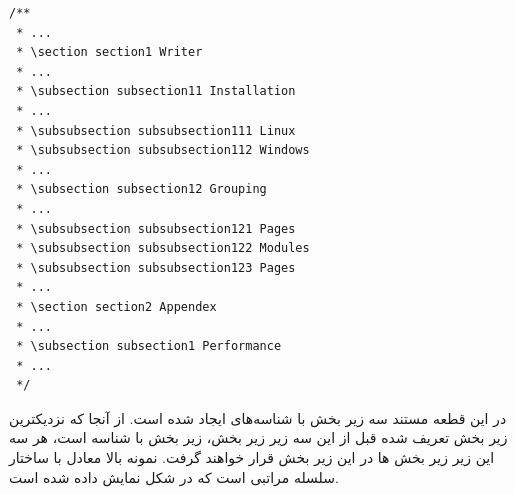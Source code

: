 \begin{latin}
\lstset{language=C++}  
\begin{lstlisting}[frame=single] 
/**
 * ...
 * \section section1 Writer
 * ...
 * \subsection subsection11 Installation
 * ...
 * \subsubsection subsubsection111 Linux
 * \subsubsection subsubsection112 Windows
 * ...
 * \subsection subsection12 Grouping
 * ...
 * \subsubsection subsubsection121 Pages
 * \subsubsection subsubsection122 Modules
 * \subsubsection subsubsection123 Pages
 * ...
 * \section section2 Appendex
 * ...
 * \subsection subsection1 Performance
 * ...
 */
\end{lstlisting}
\end{latin}

در این قطعه مستند سه زیر بخش با شناسه‌های  ایجاد شده است.
از آنجا که نزدیکترین زیر بخش تعریف شده قبل از این سه زیر زیر بخش، زیر بخش با
شناسه  است، هر سه این زیر زیر بخش ها در این زیر بخش قرار خواهند
گرفت. نمونه بالا معادل با ساختار سلسله مراتبی است که در شکل
\label{write-grouping-pages-section-tree} نمایش داده شده است.
 
